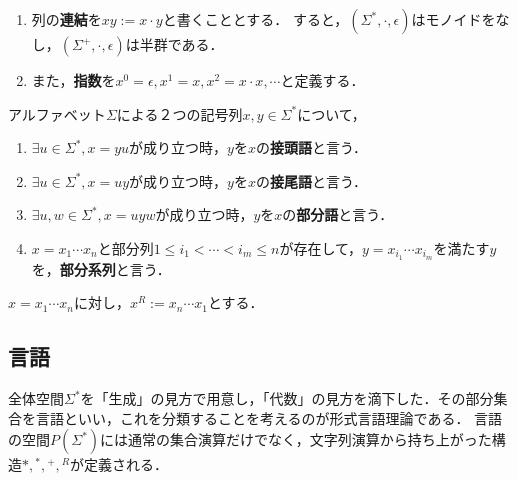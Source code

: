 \documentclass[uplatex, dvipdfmx]{jsreport}
\begin{document}
\begin{definition}\mbox{}\label{def-concatenation-of-words}
    \begin{enumerate}
        \item 列の\textbf{連結}を$xy:=x\cdot y$と書くこととする．
        すると，$(\Sigma^*,\cdot,\epsilon)$はモノイドをなし，$(\Sigma^+,\cdot,\epsilon)$は半群である．
        \item また，\textbf{指数}を$x^0=\epsilon,x^1=x,x^2=x\cdot x,\cdots$と定義する．
    \end{enumerate}
\end{definition}

\begin{definition}
    アルファベット$\Sigma$による２つの記号列$x,y\in\Sigma^*$について，
    \begin{enumerate}
        \item $\exists u\in\Sigma^*, x=yu$が成り立つ時，$y$を$x$の\textbf{接頭語}と言う．
        \item $\exists u\in\Sigma^*,x=uy$が成り立つ時，$y$を$x$の\textbf{接尾語}と言う．
        \item $\exists u,w\in\Sigma^*,x=uyw$が成り立つ時，$y$を$x$の\textbf{部分語}と言う．
        \item $x=x_1\cdots x_n$と部分列$1\le i_1<\cdots<i_m\le n$が存在して，$y=x_{i_1}\cdots x_{i_m}$を満たす$y$を，\textbf{部分系列}と言う．
    \end{enumerate}
\end{definition}

\begin{definition}[reverse]
    $x=x_1\cdots x_n$に対し，$x^R:=x_n\cdots x_1$とする．
\end{definition}

\subsection{言語}

\begin{tcolorbox}[colframe=ForestGreen, colback=ForestGreen!10!white, breakable]
    全体空間$\Sigma^*$を「生成」の見方で用意し，「代数」の見方を滴下した．その部分集合を言語といい，これを分類することを考えるのが形式言語理論である．
    言語の空間$P(\Sigma^*)$には通常の集合演算だけでなく，文字列演算から持ち上がった構造$*,{}^*,{}^+,{}^R$が定義される．
\end{tcolorbox}
\end{document}
